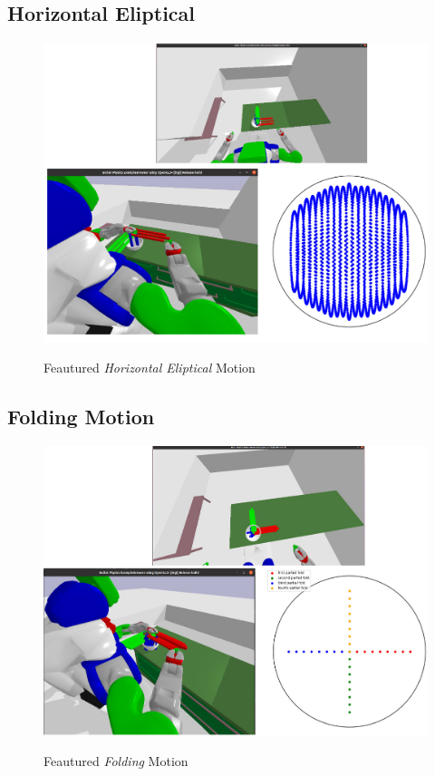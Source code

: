 \subsection*{Horizontal Eliptical}
\begin{figure}[H]
    \includegraphics[scale=0.27]{Graphics/horizontal_showcase.jpg}
    \label{fig:circularshowcase}
    \caption{Feautured \textit{Horizontal Eliptical} Motion}
\end{figure}

\subsection*{Folding Motion}
\begin{figure}[H]
    \includegraphics[scale=0.27]{Graphics/folding_showcase.jpg}
    \label{fig:foldingshowcase}
    \caption{Feautured \textit{Folding} Motion}
\end{figure} 

